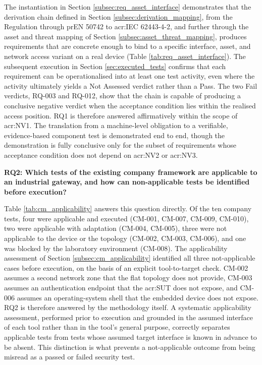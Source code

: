 The instantiation in Section \ref{subsec:req_asset_interface} demonstrates that the derivation chain defined in Section \ref{subsec:derivation_mapping}, from the Regulation through prEN 50742 to \gls{acr:IEC} 62443-4-2, and further through the asset and threat mapping of Section \ref{subsec:asset_threat_mapping}, produces requirements that are concrete enough to bind to a specific interface, asset, and network access variant on a real device (Table \ref{tab:req_asset_interface}). The subsequent execution in Section \ref{sec:executed_tests} confirms that each requirement can be operationalised into at least one test activity, even where the activity ultimately yields a Not Assessed verdict rather than a Pass. The two Fail verdicts, RQ-003 and RQ-012, show that the chain is capable of producing a conclusive negative verdict when the acceptance condition lies within the realised access position. RQ1 is therefore answered affirmatively within the scope of \gls{acr:NV1}. The translation from a machine-level obligation to a verifiable, evidence-based component test is demonstrated end to end, though the demonstration is fully conclusive only for the subset of requirements whose acceptance condition does not depend on \gls{acr:NV2} or \gls{acr:NV3}. 

\textbf{RQ2: Which tests of the existing company framework are applicable to an industrial gateway, and how can non-applicable tests be identified before execution?} 

Table \ref{tab:cm_applicability} answers this question directly. Of the ten company tests, four were applicable and executed (CM-001, CM-007, CM-009, CM-010), two were applicable with adaptation (CM-004, CM-005), three were not applicable to the device or the topology (CM-002, CM-003, CM-006), and one was blocked by the laboratory environment (CM-008). The applicability assessment of Section \ref{subsec:cm_applicability} identified all three not-applicable cases before execution, on the basis of an explicit tool-to-target check. CM-002 assumes a second network zone that the flat topology does not provide, CM-003 assumes an authentication endpoint that the \gls{acr:SUT} does not expose, and CM-006 assumes an operating-system shell that the embedded device does not expose. RQ2 is therefore answered by the methodology itself. A systematic applicability assessment, performed prior to execution and grounded in the assumed interface of each tool rather than in the tool's general purpose, correctly separates applicable tests from tests whose assumed target interface is known in advance to be absent. This distinction is what prevents a not-applicable outcome from being misread as a passed or failed security test. 

